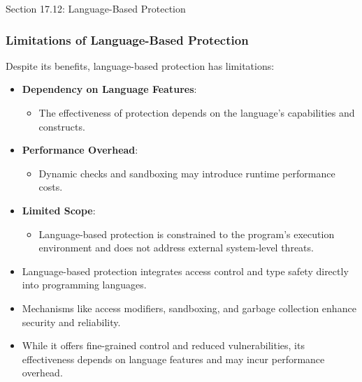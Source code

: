 \begin{notes}{Section 17.12: Language-Based Protection}
    \subsubsection*{Limitations of Language-Based Protection}
    
    Despite its benefits, language-based protection has limitations:
    \begin{itemize}
        \item \textbf{Dependency on Language Features}:
        \begin{itemize}
            \item The effectiveness of protection depends on the language's capabilities and constructs.
        \end{itemize}
        \item \textbf{Performance Overhead}:
        \begin{itemize}
            \item Dynamic checks and sandboxing may introduce runtime performance costs.
        \end{itemize}
        \item \textbf{Limited Scope}:
        \begin{itemize}
            \item Language-based protection is constrained to the program's execution environment and does not address external system-level threats.
        \end{itemize}
    \end{itemize}
    
    \begin{highlight}
        \begin{itemize}
            \item Language-based protection integrates access control and type safety directly into programming languages.
            \item Mechanisms like access modifiers, sandboxing, and garbage collection enhance security and reliability.
            \item While it offers fine-grained control and reduced vulnerabilities, its effectiveness depends on language features and may incur performance overhead.
        \end{itemize}
    \end{highlight}
\end{notes}